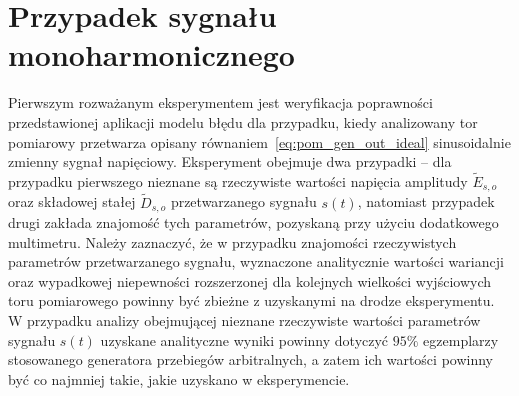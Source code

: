 \section{Przypadek sygnału monoharmonicznego}

Pierwszym rozważanym eksperymentem jest weryfikacja poprawności przedstawionej aplikacji modelu błędu dla przypadku, kiedy analizowany tor pomiarowy przetwarza opisany równaniem~\eqref{eq:pom_gen_out_ideal} sinusoidalnie zmienny sygnał napięciowy. Eksperyment obejmuje dwa przypadki -- dla przypadku pierwszego nieznane są rzeczywiste wartości napięcia amplitudy $\tilde{E}_{s,o}$ oraz składowej stałej $\tilde{D}_{s,o}$ przetwarzanego sygnału $s(t)$, natomiast przypadek drugi zakłada znajomość tych parametrów, pozyskaną przy użyciu dodatkowego multimetru. Należy zaznaczyć, że w przypadku znajomości rzeczywistych parametrów przetwarzanego sygnału, wyznaczone analitycznie wartości wariancji oraz wypadkowej niepewności rozszerzonej dla kolejnych wielkości wyjściowych toru pomiarowego powinny być zbieżne z uzyskanymi na drodze eksperymentu. W przypadku analizy obejmującej nieznane rzeczywiste wartości parametrów sygnału $s(t)$ uzyskane analityczne wyniki powinny dotyczyć $95\%$ egzemplarzy stosowanego generatora przebiegów arbitralnych, a zatem ich wartości powinny być co najmniej takie, jakie uzyskano w eksperymencie.

